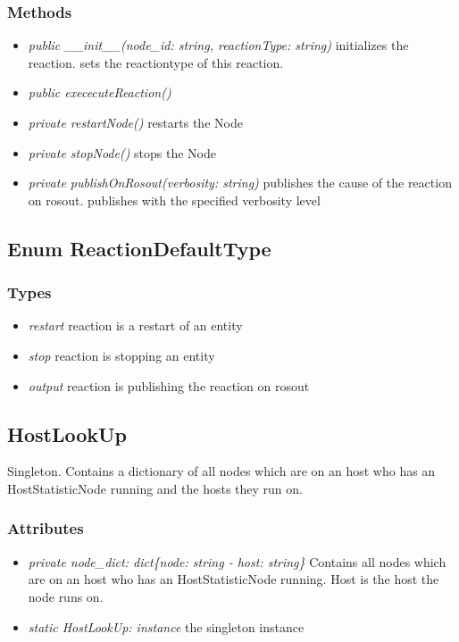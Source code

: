 \subsubsection{Methods}
\begin{itemize}
	\item \textit{ public \_\_init\_\_(node\_id: string, reactionType: string) }
		initializes the reaction. sets the reactiontype of this reaction.
	\item \textit{ public exececuteReaction() }
	\item \textit{ private restartNode() }
		restarts the Node
	\item \textit{ private stopNode() }
		stops the Node
	\item \textit{ private publishOnRosout(verbosity: string) }
		publishes the cause of the reaction on rosout. publishes with the specified verbosity level 
\end{itemize}


\subsection{Enum ReactionDefaultType}
\subsubsection{Types}
\begin{itemize}
	\item \textit{ restart }
		reaction is a restart of an entity
	\item \textit{ stop }
		reaction is stopping an entity
	\item \textit{ output }
		reaction is publishing the reaction on rosout
\end{itemize}


\subsection{HostLookUp}
Singleton. Contains a dictionary of all nodes which are on an host who has an HostStatisticNode running and the hosts they run on.
\subsubsection{Attributes}
\begin{itemize}
	\item \textit{ private node\_dict: dict\{node: string - host: string\}  }
		Contains all nodes which are on an host who has an HostStatisticNode running. Host is the host the node runs on.
	\item \textit{ static HostLookUp: instance }
		the singleton instance
\end{itemize}
